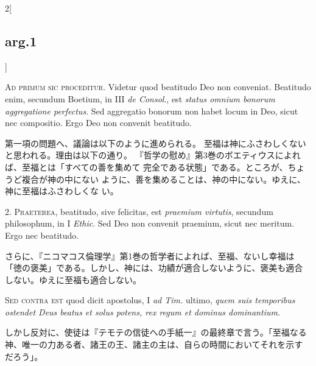 \documentclass[paper=a4paper,fontsize=10pt,jafontsize=9pt,titlepage]{jlreq}
\begin{document}
\begin{paracol}{2}[\subsection{arg.1}]

{\Huge A}{\scshape d primum sic proceditur}. Videtur quod beatitudo Deo non
conveniat. Beatitudo enim, secundum Boetium, in III {\itshape de Consol}., est
{\itshape status omnium bonorum aggregatione perfectus}. Sed aggregatio bonorum non
habet locum in Deo, sicut nec compositio. Ergo Deo non convenit
beatitudo.

\switchcolumn

第一項の問題へ、議論は以下のように進められる。
至福は神にふさわしくないと思われる。理由は以下の通り。
『哲学の慰め』第3巻のボエティウスによれば、至福とは「すべての善を集めて
 完全である状態」である。ところが、ちょうど複合が神の中にない
 ように、善を集めることは、神の中にない。ゆえに、神に至福はふさわしくな
 い。


2. {\scshape Praeterea}, beatitudo, sive felicitas, est {\itshape praemium virtutis}, secundum
philosophum, in I {\itshape Ethic}. Sed Deo non convenit praemium, sicut nec
meritum. Ergo nec beatitudo.

\switchcolumn

さらに、『ニコマコス倫理学』第1巻の哲学者によれば、至福、ないし幸福は
「徳の褒美」である。しかし、神には、功績が適合しないように、褒美も適合
しない。ゆえに至福も適合しない。

\switchcolumn*[\subsection{s.c.}]

{\scshape Sed contra est} quod dicit apostolus, I {\itshape ad Tim.} ultimo, {\itshape quem suis
temporibus ostendet Deus beatus et solus potens, rex regum et dominus
dominantium}.

\switchcolumn

しかし反対に、使徒は『テモテの信徒への手紙一』の最終章で言う。「至福なる
 神、唯一の力ある者、諸王の王、諸主の主は、自らの時間においてそれを示す
 だろう」。



\end{paracol}
\end{document}

